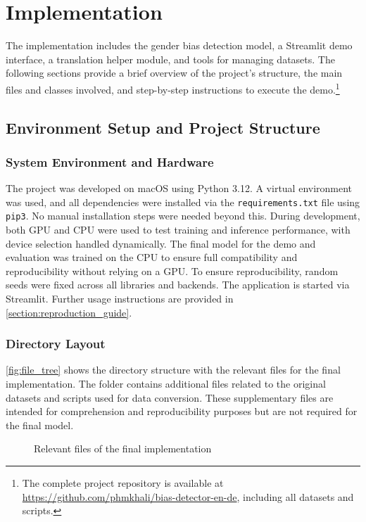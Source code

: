 \chapter{Implementation}
The implementation includes the gender bias detection model, a Streamlit demo interface, a translation helper module, and tools for managing datasets. The following sections provide a brief overview of the project’s structure, the main files and classes involved, and step-by-step instructions to execute the demo.\footnote{The complete project repository is available at \url{https://github.com/phmkhali/bias-detector-en-de}, including all datasets and scripts.}

\section{Environment Setup and Project Structure}
    \subsection{System Environment and Hardware}
    The project was developed on macOS using Python 3.12. A virtual environment was used, and all dependencies were installed via the \texttt{requirements.txt} file using \texttt{pip3}. No manual installation steps were needed beyond this. During development, both GPU and CPU were used to test training and inference performance, with device selection handled dynamically. The final model for the demo and evaluation was trained on the CPU to ensure full compatibility and reproducibility without relying on a GPU. To ensure reproducibility, random seeds were fixed across all libraries and backends. The application is started via Streamlit. Further usage instructions are provided in \autoref{section:reproduction_guide}.

\subsection{Directory Layout}
    \autoref{fig:file_tree} shows the directory structure with the relevant files for the final implementation. The folder contains additional files related to the original datasets and scripts used for data conversion. These supplementary files are intended for comprehension and reproducibility purposes but are not required for the final model.

    \vspace{0.8em} 
    \begin{figure}[htb]
        \centering
        \scalebox{0.8}{}
        \caption[Relevant files of the final implementation]{Relevant files of the final implementation}
        \label{fig:file_tree}
    \end{figure}
    \vspace{0.8em} 


